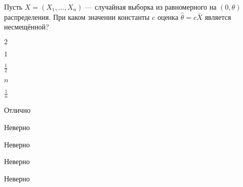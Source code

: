 
\begin{question}
Пусть \(X = (X_1, \ldots , X_n)\) — случайная выборка из равномерного
на \((0, \theta)\) распределения. При каком значении константы \(c\)
оценка \(\hat{\theta} = c \bar{X}\) является несмещённой?
\begin{answerlist}
  \item \(2\)
  \item \(1\)
  \item \(\frac{1}{2}\)
  \item \(n\)
  \item \(\frac{1}{n}\)
\end{answerlist}
\end{question}

\begin{solution}
\begin{answerlist}
  \item Отлично
  \item Неверно
  \item Неверно
  \item Неверно
  \item Неверно
\end{answerlist}
\end{solution}

